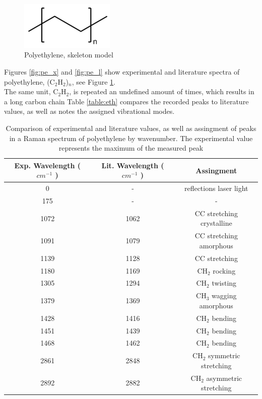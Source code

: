     \begin{figure} %
        \centering
        \vspace{-20pt}
        \includegraphics[width=0.4\textwidth]{images/raman_spectra/pe_i.png}
        \caption{Polyethylene, skeleton model}
        \label{fig:pe_i}
    \end{figure}


    Figures \ref{fig:pe_x} and \ref{fig:pe_l} show experimental and literature spectra of polyethylene, (C\(_2\)H\(_2\))\(_n\), see Figure \ref{fig:pe_i}. \\
    The same unit, C\(_2\)H\(_2\), is repeated an undefined amount of times, which results in a long carbon chain Table \ref{table:eth} compares the recorded peaks to literature values, as well as notes the assigned vibrational modes. 

    \begin{table}[h]
    \begin{center}
        \vspace{15pt}
        \begin{tabular}{|c|c|c|}
         \hline
         Exp. Wavelength (\( cm^{-1} \) ) & Lit. Wavelength  (\( cm^{-1} \) ) & Assingment  \\ 
         \hline
         0 & - & reflections laser light \\
         175 & - & - \\
         1072 & 1062 & CC stretching crystalline\\ 
         1091 & 1079 & CC stretching amorphous\\
         1139 & 1128 & CC stretching\\
         1180 & 1169 & CH\(_2\) rocking\\
         1305 & 1294 & CH\(_2\) twisting\\
         1379 & 1369 & CH\(_3\) wagging amorphous\\
         1428 & 1416 & CH\(_2\) bending \\
         1451 & 1439 & CH\(_2\) bending\\
         1468 & 1462 & CH\(_2\) bending\\
         2861& 2848 &  CH\(_2\) symmetric stretching\\
         2892& 2882 &  CH\(_2\) asymmetric stretching\\
         \hline
        \end{tabular}
        \caption{Comparison of experimental and literature \cite{pel1} \cite{pel2} values, as well as assingment of peaks in a Raman spectrum of polyethylene by wavenumber. The experimental value represents the maximum of the measured peak }
        \label{table:pe}
    \end{center}
    \end{table}

